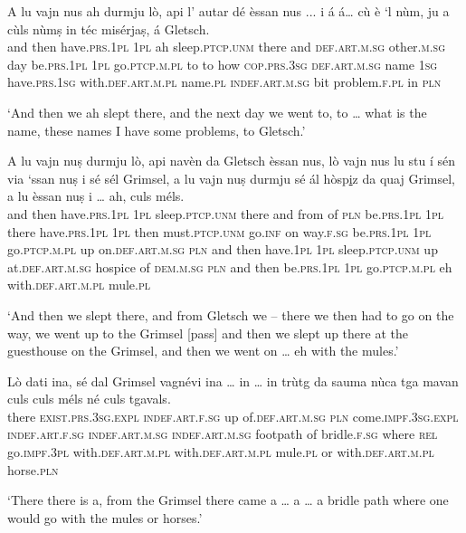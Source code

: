 \begin{linenumbers}
\gll  A lu vajn nus ah durmju lò, api l’ autar dé èssan nus ... i á á… cù è `l nùm, ju a cùls nùmṣ in téc misérjaṣ, á Gletsch.  \\ 
and then have.\textsc{prs.1pl} \textsc{1pl} ah sleep.\textsc{ptcp.unm} there and \textsc{def.art.m.sg} other.\textsc{m.sg} day be.\textsc{prs.1pl} \textsc{1pl} {} go.\textsc{ptcp.m.pl} to to {} how \textsc{cop.prs.3sg} \textsc{def.art.m.sg} name \textsc{1sg} have.\textsc{prs.1sg} with.\textsc{def.art.m.pl} name.\textsc{pl} \textsc{indef.art.m.sg} bit {} problem.\textsc{f.pl} {} in \textsc{pln} \\
\end{linenumbers}
\medskip
\glt `And then we ah slept there, and the next day we went to, to … what is the name, these names I have some problems, to Gletsch.'
\medskip

\begin{linenumbers}
\gll   A lu vajn nuṣ durmju lò, api navèn da Gletsch èssan nus, lò vajn nus lu stu í sén via\footnotemark{} `ssan nuṣ i sé sél Grimsel, a lu vajn nuṣ durmju sé ál hòsp\underline{i}z da quaj Grimsel, a lu èssan nuṣ i … ah, culs méls. \\
and then  have.\textsc{prs.1pl} \textsc{1pl} sleep.\textsc{ptcp.unm} there and from of \textsc{pln} be.\textsc{prs.1pl} \textsc{1pl} there have.\textsc{prs.1pl}  \textsc{1pl} then must.\textsc{ptcp.unm} go.\textsc{inf} on way.\textsc{f.sg} be.\textsc{prs.1pl} \textsc{1pl} go.\textsc{ptcp.m.pl} up on.\textsc{def.art.m.sg}  \textsc{pln} and then have.\textsc{1pl} \textsc{1pl} sleep.\textsc{ptcp.unm} up at.\textsc{def.art.m.sg} hospice of \textsc{dem.m.sg} \textsc{pln} and then be.\textsc{prs.1pl}  \textsc{1pl} go.\textsc{ptcp.m.pl} {} eh with.\textsc{def.art.m.pl}  mule.\textsc{pl} \\
\end{linenumbers}
\medskip
\glt `And then we slept there, and from Gletsch we – there we then had to go on the way, we went up to the Grimsel [pass] and then we slept up there at the guesthouse on the Grimsel, and then we went on … eh with the mules.'
\medskip

\begin{linenumbers}
\gll Lò dati ina, sé dal Grimsel vagnévi ina … in … in trùtg da sauma nùca tga mavan culs culs méls né culs tgavals.\\
there \textsc{exist.prs.3sg.expl} \textsc{indef.art.f.sg} up of.\textsc{def.art.m.sg}  \textsc{pln}  come.\textsc{impf.3sg.expl} \textsc{indef.art.f.sg} {} \textsc{indef.art.m.sg} {} \textsc{indef.art.m.sg} footpath of bridle.\textsc{f.sg} where \textsc{rel} go.\textsc{impf.3pl} with.\textsc{def.art.m.pl} with.\textsc{def.art.m.pl} mule.\textsc{pl} or with.\textsc{def.art.m.pl} horse.\textsc{pln}\\
\end{linenumbers}
\medskip
\glt `There there is a, from the Grimsel there came a … a … a bridle path where one would go with the mules or horses.'
\medskip

